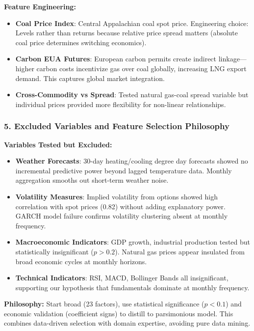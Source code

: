 \documentclass[12pt,a4paper]{article}
\begin{document}
\textbf{Feature Engineering:}
\begin{itemize}
    \item \textbf{Coal Price Index}: Central Appalachian coal spot price. Engineering choice: Levels rather than returns because relative price spread matters (absolute coal price determines switching economics).
    \item \textbf{Carbon EUA Futures}: European carbon permits create indirect linkage—higher carbon costs incentivize gas over coal globally, increasing LNG export demand. This captures global market integration.
    \item \textbf{Cross-Commodity vs Spread}: Tested natural gas-coal spread variable but individual prices provided more flexibility for non-linear relationships.
\end{itemize}

\subsubsection{5. Excluded Variables and Feature Selection Philosophy}

\textbf{Variables Tested but Excluded:}
\begin{itemize}
    \item \textbf{Weather Forecasts}: 30-day heating/cooling degree day forecasts showed no incremental predictive power beyond lagged temperature data. Monthly aggregation smooths out short-term weather noise.
    \item \textbf{Volatility Measures}: Implied volatility from options showed high correlation with spot prices (0.82) without adding explanatory power. GARCH model failure confirms volatility clustering absent at monthly frequency.
    \item \textbf{Macroeconomic Indicators}: GDP growth, industrial production tested but statistically insignificant ($p > 0.2$). Natural gas prices appear insulated from broad economic cycles at monthly horizons.
    \item \textbf{Technical Indicators}: RSI, MACD, Bollinger Bands all insignificant, supporting our hypothesis that fundamentals dominate at monthly frequency.
\end{itemize}

\textbf{Philosophy:} Start broad (23 factors), use statistical significance ($p < 0.1$) and economic validation (coefficient signs) to distill to parsimonious model. This combines data-driven selection with domain expertise, avoiding pure data mining.
\end{document}
